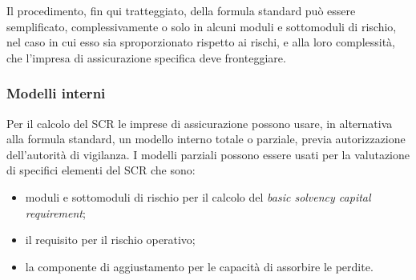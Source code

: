 Il procedimento, fin qui tratteggiato, della formula standard può essere semplificato, complessivamente o solo in alcuni moduli e sottomoduli di rischio, nel caso in cui esso sia sproporzionato rispetto ai rischi, e alla loro complessità, che l’impresa di assicurazione specifica deve fronteggiare.

\subsubsection{Modelli interni}
Per il calcolo del SCR le imprese di assicurazione possono usare, in alternativa alla formula standard, un modello interno totale o parziale, previa autorizzazione dell’autorità di vigilanza.
I modelli parziali possono essere usati per la valutazione di specifici elementi del SCR che sono:
\begin{itemize}
\item	 moduli e sottomoduli di rischio per il calcolo del {\itshape basic solvency capital requirement};
\item	 il requisito per il rischio operativo;
\item	 la componente di aggiustamento per le capacità di assorbire le perdite.
\end{itemize}


